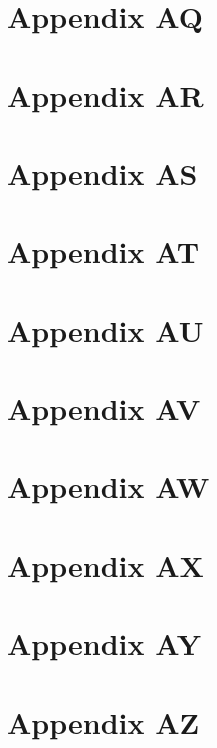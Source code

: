 \chapter{Appendix AQ}

\chapter{Appendix AR}

\chapter{Appendix AS}

\chapter{Appendix AT}

\chapter{Appendix AU}

\chapter{Appendix AV}

\chapter{Appendix AW}

\chapter{Appendix AX}

\chapter{Appendix AY}

\chapter{Appendix AZ}

